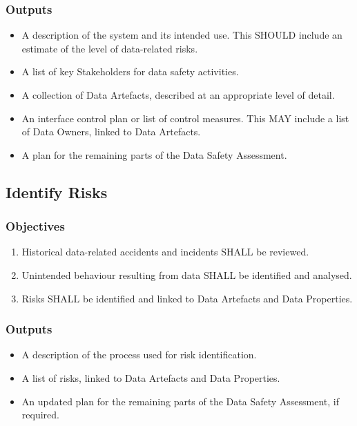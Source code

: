 \subsubsection{Outputs}
\begin{itemize}
	\item A description of the system and its intended use. This SHOULD include an estimate of the level of data-related risks.
	\item A list of key Stakeholders for data safety activities.
	\item A collection of Data Artefacts, described at an appropriate level of detail.
	\item An interface control plan or list of control measures. This MAY include a list of Data Owners, linked to Data Artefacts.
	\item A plan for the remaining parts of the Data Safety Assessment.
\end{itemize}

\subsection{Identify Risks}
\subsubsection{Objectives}
\begin{enumerate}[label=\color{dsiwgAccentColour}{2-\arabic*}]
	\item Historical data-related accidents and incidents SHALL be reviewed.
	\item Unintended behaviour resulting from data SHALL be identified and analysed.
	\item Risks SHALL be identified and linked to Data Artefacts and Data Properties.
\end{enumerate}

\subsubsection{Outputs}
\begin{itemize}
	\item A description of the process used for risk identification.
	\item A list of risks, linked to Data Artefacts and Data Properties.
	\item An updated plan for the remaining parts of the Data Safety Assessment, if required.
\end{itemize}

